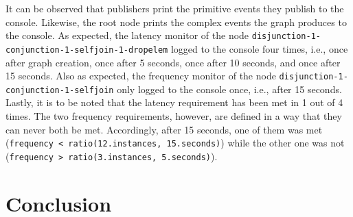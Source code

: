 \documentclass[article, type=bsc, colorback, accentcolor=tud8b, parskip=half, bibliography=totocnumbered]{tudthesis}
\begin{document}
It can be observed that publishers print the primitive events they publish to the console.
Likewise, the root node prints the complex events the graph produces to the console.
As expected, the latency monitor of the node \lstinline{disjunction-1-conjunction-1-selfjoin-1-dropelem} logged to the console four times, i.e., once after graph creation, once after 5 seconds, once after 10 seconds, and once after 15 seconds.
Also as expected, the frequency monitor of the node \lstinline{disjunction-1-conjunction-1-selfjoin} only logged to the console once, i.e., after 15 seconds.
Lastly, it is to be noted that the latency requirement has been met in 1 out of 4 times.
The two frequency requirements, however, are defined in a way that they can never both be met.
Accordingly, after 15 seconds, one of them was met (\lstinline{frequency < ratio(12.instances, 15.seconds)}) while the other one was not (\lstinline{frequency > ratio(3.instances, 5.seconds)}).

\newpage

\section{Conclusion}
\label{sec:conclusion}

\newpage

\printbibliography
\end{document}
